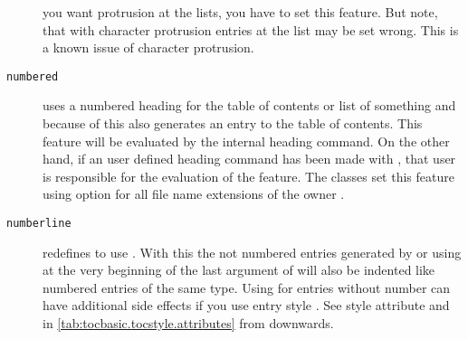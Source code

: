 \begin{description}
  you want protrusion at the lists, you have to set this feature. But
  note, that with character protrusion entries at the
  list may be set wrong. This is a known issue of character protrusion.
\item[\texttt{numbered}] uses a numbered heading for the table of contents or
  list of something and because of this also generates an entry to the table
  of contents. This feature will be evaluated by the internal heading
  command. On the other hand, if an user defined heading command has been made
  with , that user is responsible for the evaluation of
  the feature. The \KOMAScript{} classes set this feature using option
   for all file name extensions of the
  owner .
\item[\texttt{numberline}] \leavevmode{}%
  redefines  to use . With this the not
  numbered entries generated by \KOMAScript{} or using  at
  the very beginning of the last argument of  will also
  be indented like numbered entries of the same
  type. Using  for
  entries without number can have
  additional side effects if you use entry style . See style
  attribute  and  in
  \autoref{tab:tocbasic.tocstyle.attributes} from
   downwards.


\end{description}
